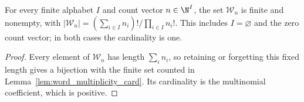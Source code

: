 \begin{lemma}
\label{lem:poisson_word_count_fiber}
\leanok
{}
For every finite alphabet $I$ and count vector $n\in\N^I$, the set
$\mathcal W_n$ is finite and nonempty, with
$|\mathcal W_n|=(\sum_{i\in I}n_i)!/\prod_{i\in I}n_i!$.
This includes $I=\varnothing$ and the zero count vector; in both cases the
cardinality is one.
\end{lemma}
\begin{proof}
\leanok
{}
Every element of $\mathcal W_n$ has length $\sum_i n_i$, so retaining or
forgetting this fixed length gives a bijection with the finite set counted
in Lemma~\ref{lem:word_multiplicity_card}.
Its cardinality is the multinomial coefficient, which is positive.
\end{proof}
